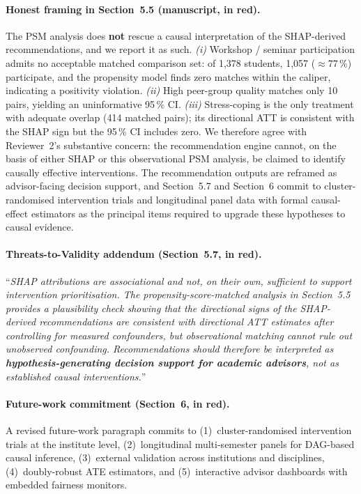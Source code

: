 \documentclass[11pt,a4paper]{article}
\newcommand{\sectref}[1]{Section~#1}
\newcommand{\stress}[1]{\textbf{#1}}
\begin{document}
\begin{itemize}
\paragraph{Honest framing in \sectref{5.5} (manuscript, in red).}

\begin{evidencebox}
\noindent The PSM analysis does \stress{not} rescue a causal interpretation of the SHAP-derived recommendations, and we report it as such. \emph{(i)} Workshop / seminar participation admits no acceptable matched comparison set: of 1{,}378 students, 1{,}057 ($\approx 77\,\%$) participate, and the propensity model finds zero matches within the caliper, indicating a positivity violation. \emph{(ii)} High peer-group quality matches only 10 pairs, yielding an uninformative 95\,\% CI. \emph{(iii)} Stress-coping is the only treatment with adequate overlap (414 matched pairs); its directional ATT is consistent with the SHAP sign but the 95\,\% CI includes zero. We therefore agree with Reviewer~2's substantive concern: the recommendation engine cannot, on the basis of either SHAP or this observational PSM analysis, be claimed to identify causally effective interventions. The recommendation outputs are reframed as advisor-facing decision support, and \sectref{5.7} and \sectref{6} commit to cluster-randomised intervention trials and longitudinal panel data with formal causal-effect estimators as the principal items required to upgrade these hypotheses to causal evidence.
\end{evidencebox}

\paragraph{Threats-to-Validity addendum (\sectref{5.7}, in red).}
``\textit{SHAP attributions are associational and not, on their own, sufficient to support intervention prioritisation. The propensity-score-matched analysis in \sectref{5.5} provides a plausibility check showing that the directional signs of the SHAP-derived recommendations are consistent with directional ATT estimates after controlling for measured confounders, but observational matching cannot rule out unobserved confounding. Recommendations should therefore be interpreted as \stress{hypothesis-generating decision support for academic advisors}, not as established causal interventions.}''

\paragraph{Future-work commitment (\sectref{6}, in red).} A revised future-work paragraph commits to (1)~cluster-randomised intervention trials at the institute level, (2)~longitudinal multi-semester panels for DAG-based causal inference, (3)~external validation across institutions and disciplines, (4)~doubly-robust ATE estimators, and (5)~interactive advisor dashboards with embedded fairness monitors.


\end{itemize}
\end{document}
